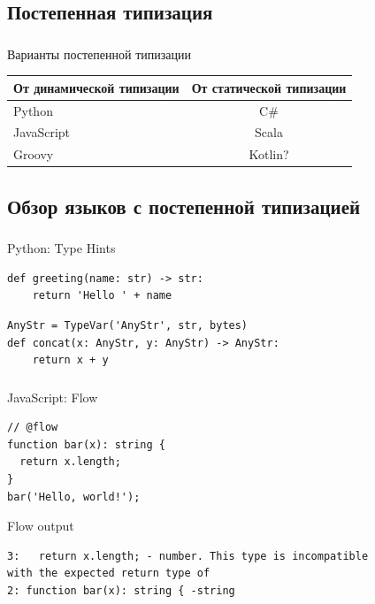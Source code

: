 \documentclass[t]{beamer}  %
\begin{document}
\subsection{Постепенная типизация}

\begin{frame}[fragile]
	\frametitle{\insertsection} 
    \framesubtitle{\insertsubsection}
	\begin{block}{Варианты постепенной типизации}
		\begin{table}
			\begin{tabular}{l | c  }
				От динамической типизации & От статической типизации \\
				\hline \hline
				Python & C\# \\ 
				JavaScript & Scala\\
				Groovy &  Kotlin?  
			\end{tabular}
		\end{table}
    \end{block}
\end{frame}


\subsection{Обзор языков с постепенной типизацией}

\begin{frame}[fragile]
	\frametitle{\insertsection} 
    \framesubtitle{\insertsubsection}
	\begin{block}{Python: Type Hints}
	\begin{verbatim}
def greeting(name: str) -> str:
    return 'Hello ' + name
	\end{verbatim}
    \begin{verbatim}
AnyStr = TypeVar('AnyStr', str, bytes)
def concat(x: AnyStr, y: AnyStr) -> AnyStr:
    return x + y
	\end{verbatim}
    \end{block}
\end{frame}



\begin{frame}[fragile]
	\frametitle{\insertsection} 
    \framesubtitle{\insertsubsection}
\begin{block}{JavaScript: Flow}
	\begin{verbatim}
// @flow
function bar(x): string {
  return x.length;
}
bar('Hello, world!');
	\end{verbatim}
    \begin{alertblock}{Flow output}
    \begin{verbatim}
3:   return x.length; - number. This type is incompatible 
with the expected return type of
2: function bar(x): string { -string 
    \end{verbatim}
    \end{alertblock}
    \end{block}
\end{frame}
\end{document}
